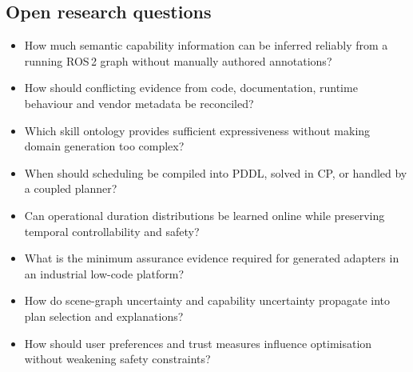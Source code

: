 \documentclass{plan4ari_report}
\begin{document}
\subsection{Open research questions}
\begin{itemize}
\item How much semantic capability information can be inferred reliably from a running ROS\,2 graph without manually authored annotations?
\item How should conflicting evidence from code, documentation, runtime behaviour and vendor metadata be reconciled?
\item Which skill ontology provides sufficient expressiveness without making domain generation too complex?
\item When should scheduling be compiled into PDDL, solved in CP, or handled by a coupled planner?
\item Can operational duration distributions be learned online while preserving temporal controllability and safety?
\item What is the minimum assurance evidence required for generated adapters in an industrial low-code platform?
\item How do scene-graph uncertainty and capability uncertainty propagate into plan selection and explanations?
\item How should user preferences and trust measures influence optimisation without weakening safety constraints?
\end{itemize}

\clearpage
\nocite{singh2023progprompt,ahn2023saycan,lin2023text2motion,izzo2024btgenbot,colledanchise2018bt,btcpp_docs}


\end{document}
